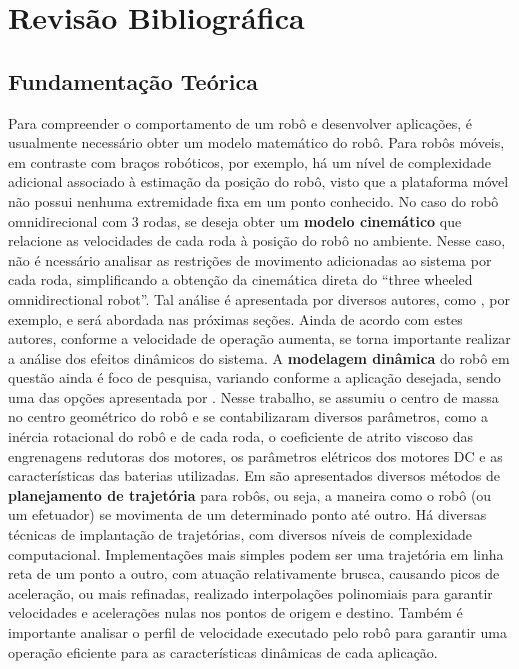 \section{Revisão Bibliográfica}
\label{sec:revbib}

\subsection{Fundamentação Teórica}

Para compreender o comportamento de um robô e desenvolver aplicações, é usualmente necessário obter um modelo matemático do robô. Para robôs móveis, em contraste com braços robóticos, por exemplo, há um nível de complexidade adicional associado à estimação da posição do robô, visto que a plataforma móvel não possui nenhuma extremidade fixa em um ponto conhecido. No caso do robô omnidirecional com 3 rodas, se deseja obter um \textbf{modelo cinemático} que relacione as velocidades de cada roda à posição do robô no ambiente. Nesse caso, não é ncessário analisar as restrições de movimento adicionadas ao sistema por cada roda, simplificando a obtenção da cinemática direta do ``three wheeled omnidirectional robot''. Tal análise é apresentada por diversos autores, como \citet{siegwart2011introduction}, por exemplo, e será abordada nas próximas seções. Ainda de acordo com estes autores, conforme a velocidade de operação aumenta, se torna importante realizar a análise dos efeitos dinâmicos do sistema. A \textbf{modelagem dinâmica} do robô em questão ainda é foco de pesquisa, variando conforme a aplicação desejada, sendo uma das opções apresentada por \citet{kim2014minenergy}. Nesse trabalho, se assumiu o centro de massa no centro geométrico do robô e se contabilizaram diversos parâmetros, como a inércia rotacional do robô e de cada roda, o coeficiente de atrito viscoso das engrenagens redutoras dos motores, os parâmetros elétricos dos motores DC e as características das baterias utilizadas.
Em \citet{lynch2017modern} são apresentados diversos métodos de \textbf{planejamento de trajetória} para robôs, ou seja, a maneira como o robô (ou um efetuador) se movimenta de um determinado ponto até outro. Há diversas técnicas de implantação de trajetórias, com diversos níveis de complexidade computacional. Implementações mais simples podem ser uma trajetória em linha reta de um ponto a outro, com atuação relativamente brusca, causando picos de aceleração, ou mais refinadas, realizado interpolações polinomiais para garantir velocidades e acelerações nulas nos pontos de origem e destino. Também é importante analisar o perfil de velocidade executado pelo robô para garantir uma operação eficiente para as características dinâmicas de cada aplicação.


